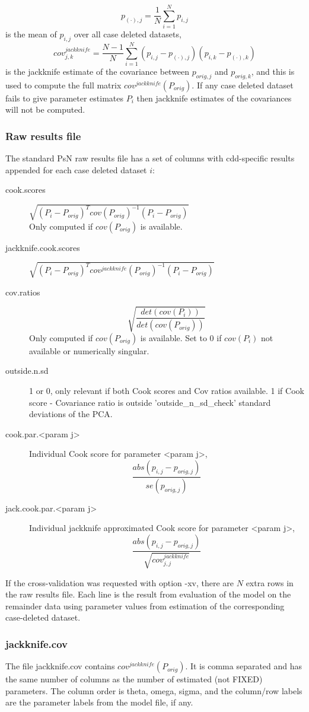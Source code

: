 \[
p_{(\cdot),j}=\frac{1}{N}\sum_{i=1}^{N}p_{i,j} 
\]
is the mean of $p_{i,j}$ over all case deleted datasets, 
\[
cov^{jackknife}_{j,k} = \frac{N-1}{N}\sum_{i=1}^{N}\left(p_{i,j}-p_{(\cdot),j}\right)\left(p_{i,k}-p_{(\cdot),k}\right)
\]
is the jackknife estimate of the covariance between $p_{orig,j}$ and $p_{orig,k}$, and this is used
to compute the full matrix
$cov^{jackknife}(P_{orig})$. If any case deleted dataset fails to give parameter estimates $P_{i}$ then
jackknife estimates of the covariances will not be computed.

\subsubsection*{Raw results file}
The standard PsN raw results file has a set of columns with cdd-specific results appended
for each case deleted dataset $i$:
\begin{description}
\item[cook.scores] $\sqrt{\left(P_{i}-P_{orig}\right)^Tcov(P_{orig})^{-1}\left(P_{i}-P_{orig}\right)}$\\
Only computed if $cov(P_{orig})$ is available.
\item[jackknife.cook.scores] $\sqrt{\left(P_{i}-P_{orig}\right)^Tcov^{jackknife}(P_{orig})^{-1}\left(P_{i}-P_{orig}\right)}$
\item[cov.ratios] \[\sqrt{\frac{det(cov(P_{i}))}{det(cov(P_{orig}))}}\]
Only computed if $cov(P_{orig})$ is available.
Set to 0 if $cov(P_{i})$ not available or numerically singular.
\item[outside.n.sd] 1 or 0, only relevant if both Cook scores and Cov ratios available.
1 if Cook score - Covariance ratio is outside 'outside\_n\_sd\_check' standard deviations of the PCA. 
\item[cook.par.<param j>] Individual Cook score for parameter <param j>,
\[\frac{abs\left(p_{i,j}-p_{orig,j}\right)}{se(p_{orig,j})} \]
\item[jack.cook.par.<param j>] Individual jackknife approximated Cook score for parameter <param j>,
\[\frac{abs\left(p_{i,j}-p_{orig,j}\right)}{\sqrt{cov^{jackknife}_{j,j}}}\]
\end{description}

If the cross-validation was requested with option -xv, there are $N$ extra rows in the raw results file.
Each line is the result from evaluation of the model on the remainder data using parameter values from
estimation of the corresponding case-deleted dataset.

\subsubsection*{jackknife.cov}
The file jackknife.cov contains $cov^{jackknife}(P_{orig})$. It is comma separated and has the same number of columns
as the number of estimated (not FIXED) parameters. The column order is theta, omega, sigma, and the
column/row labels are the parameter labels from the model file, if any.

